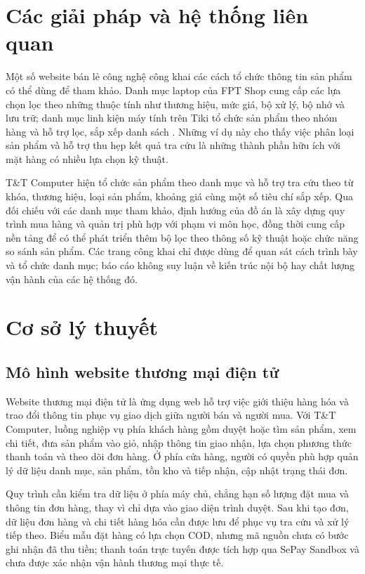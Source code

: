 \section{Các giải pháp và hệ thống liên quan}
Một số website bán lẻ công nghệ công khai các cách tổ chức thông tin sản phẩm có thể dùng để tham khảo. Danh mục laptop của FPT Shop cung cấp các lựa chọn lọc theo những thuộc tính như thương hiệu, mức giá, bộ xử lý, bộ nhớ và lưu trữ; danh mục linh kiện máy tính trên Tiki tổ chức sản phẩm theo nhóm hàng và hỗ trợ lọc, sắp xếp danh sách \cite{fptshop-laptop,tiki-components}. Những ví dụ này cho thấy việc phân loại sản phẩm và hỗ trợ thu hẹp kết quả tra cứu là những thành phần hữu ích với mặt hàng có nhiều lựa chọn kỹ thuật.

T\&T Computer hiện tổ chức sản phẩm theo danh mục và hỗ trợ tra cứu theo từ khóa, thương hiệu, loại sản phẩm, khoảng giá cùng một số tiêu chí sắp xếp. Qua đối chiếu với các danh mục tham khảo, định hướng của đồ án là xây dựng quy trình mua hàng và quản trị phù hợp với phạm vi môn học, đồng thời cung cấp nền tảng để có thể phát triển thêm bộ lọc theo thông số kỹ thuật hoặc chức năng so sánh sản phẩm. Các trang công khai chỉ được dùng để quan sát cách trình bày và tổ chức danh mục; báo cáo không suy luận về kiến trúc nội bộ hay chất lượng vận hành của các hệ thống đó.

\section{Cơ sở lý thuyết}
\subsection{Mô hình website thương mại điện tử}
Website thương mại điện tử là ứng dụng web hỗ trợ việc giới thiệu hàng hóa và trao đổi thông tin phục vụ giao dịch giữa người bán và người mua. Với T\&T Computer, luồng nghiệp vụ phía khách hàng gồm duyệt hoặc tìm sản phẩm, xem chi tiết, đưa sản phẩm vào giỏ, nhập thông tin giao nhận, lựa chọn phương thức thanh toán và theo dõi đơn hàng. Ở phía cửa hàng, người có quyền phù hợp quản lý dữ liệu danh mục, sản phẩm, tồn kho và tiếp nhận, cập nhật trạng thái đơn.

Quy trình cần kiểm tra dữ liệu ở phía máy chủ, chẳng hạn số lượng đặt mua và thông tin đơn hàng, thay vì chỉ dựa vào giao diện trình duyệt. Sau khi tạo đơn, dữ liệu đơn hàng và chi tiết hàng hóa cần được lưu để phục vụ tra cứu và xử lý tiếp theo. Biểu mẫu đặt hàng có lựa chọn COD, nhưng mã nguồn chưa có bước ghi nhận đã thu tiền; thanh toán trực tuyến được tích hợp qua SePay Sandbox và chưa được xác nhận vận hành thương mại thực tế.

